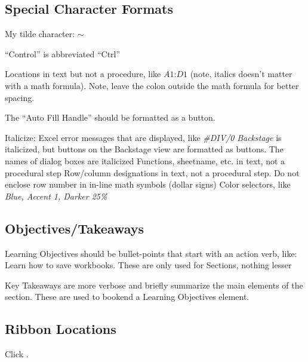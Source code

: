\begin{enumerate}[resume]
\subsection{Special Character Formats}
My tilde character: $\sim$

``Control'' is abbreviated ``Ctrl''

Locations in text but not a procedure, like $ A1 $:$ D1 $ (note, italics doesn't matter with a math formula). Note, leave the colon outside the math formula for better spacing.

The ``Auto Fill Handle'' should be formatted as a button.

Italicize:
  Excel error messages that are displayed, like \textit{#DIV/0}
  \textit{Backstage} is italicized, but buttons on the Backstage view are formatted as buttons.
  The names of dialog boxes are italicized
  Functions, sheetname, etc. in text, not a procedural step
  Row/column designations in text, not a procedural step. Do not enclose row number in in-line math symbols (dollar signs)
  Color selectors, like \textit{Blue, Accent 1, Darker 25\%}

\subsection{Objectives/Takeaways}

Learning Objectives should be bullet-points that start with an action verb, like: Learn how to save workbooks. These are only used for Sections, nothing lesser

Key Takeaways are more verbose and briefly summarize the main elements of the section. These are used to bookend a Learning Objectives element.

\subsection{Ribbon Locations}
Click .


\end{enumerate}
